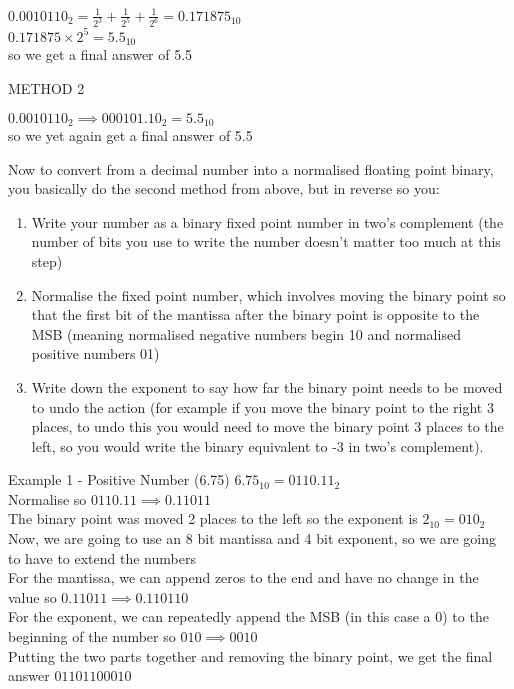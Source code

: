   $0.0010110_2= \frac{1}{2^3} + \frac{1}{2^5} + \frac{1}{2^6} = 0.171875_{10}$ \\
  $0.171875\times2^5 = 5.5_{10}$ \\
  so we get a final answer of 5.5
  
  METHOD 2
  
  $0.0010110_2 \implies 000101.10_2 = 5.5_{10}$\\
  so we yet again get a final answer of 5.5
  
  Now to convert from a decimal number into a normalised floating point binary, you basically do the second method from above, but in reverse so you:
  \begin{enumerate}
  	\item Write your number as a binary fixed point number in two's complement (the number of bits you use to write the number doesn't matter too much at this step)
  	\item Normalise the fixed point number, which involves moving the binary point so that the first bit of the mantissa after the binary point is opposite to the MSB (meaning normalised negative numbers begin 10 and normalised positive numbers 01)
  	\item Write down the exponent to say how far the binary point needs to be moved to undo the action (for example if you move the binary point to the right 3 places, to undo this you would need to move the binary point 3 places to the left, so you would write the binary equivalent to -3 in two's complement).
  \end{enumerate}
  
  Example 1 - Positive Number (6.75)
  $6.75_{10} = 0110.11_2$ \\
  Normalise so $0110.11 \implies 0.11011 $\\
  The binary point was moved 2 places to the left so the exponent is $2_{10} = 010_2$
  Now, we are going to use an 8 bit mantissa and 4 bit exponent, so we are going to have to extend the numbers \\
  For the mantissa, we can append zeros to the end and have no change in the value so $0.11011 \implies 0.110110$ \\
  For the exponent, we can repeatedly append the MSB (in this case a 0) to the beginning of the number so $ 010 \implies 0010$ \\
  Putting the two parts together and removing the binary point, we get the final answer $01101100010$
  
